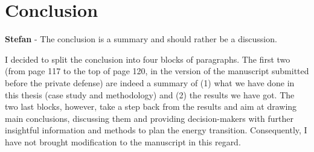 \documentclass[12pt,a4paper]{article}
\begin{document}
\section{Conclusion}
\label{Conclusion}

\begin{mdframed}[style=comment] %
{\color{teal} \textbf{Stefan}} - The conclusion is a summary and should rather be a discussion.
\end{mdframed}

\noindent I decided to split the conclusion into four blocks of paragraphs. The first two (from page 117 to the top of page 120, in the version of the manuscript submitted before the private defense) are indeed a summary of (1) what we have done in this thesis (case study and methodology) and (2) the results we have got. The two last blocks, however, take a step back from the results and aim at drawing main conclusions, discussing them and providing decision-makers with further insightful information and methods to plan the energy transition. Consequently, I have not brought modification to the manuscript in this regard.

\clearpage
\def\bibfont{\scriptsize}

\normalsize
\end{document}
